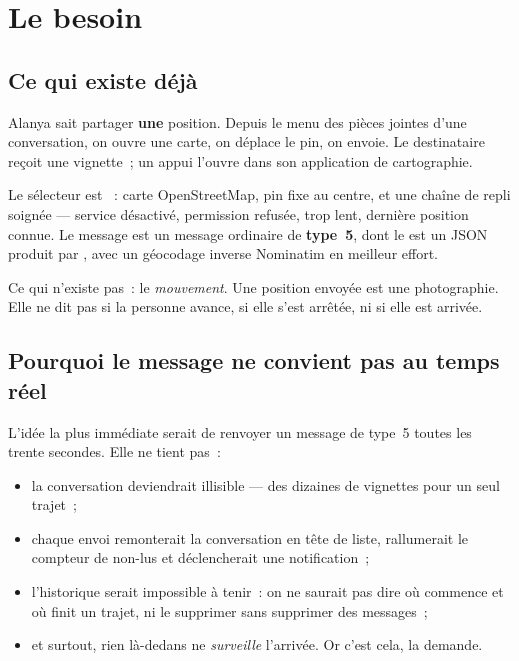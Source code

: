 
\chapter{Le besoin}

\section{Ce qui existe déjà}

Alanya sait partager \textbf{une} position. Depuis le menu des pièces jointes d'une
conversation, on ouvre une carte, on déplace le pin, on envoie. Le destinataire reçoit une
vignette~; un appui l'ouvre dans son application de cartographie.

\begin{constat}
Le sélecteur est ~: carte
OpenStreetMap, pin fixe au centre, et une chaîne de repli soignée --- service désactivé,
permission refusée,  trop lent, dernière position connue. Le
message est un message ordinaire de \textbf{type~5}, dont le  est un JSON
 produit par
, avec un géocodage inverse Nominatim en
meilleur effort.
\end{constat}

Ce qui n'existe pas~: le \emph{mouvement}. Une position envoyée est une photographie. Elle
ne dit pas si la personne avance, si elle s'est arrêtée, ni si elle est arrivée.

\section{Pourquoi le message ne convient pas au temps réel}

L'idée la plus immédiate serait de renvoyer un message de type~5 toutes les trente secondes.
Elle ne tient pas~:

\begin{itemize}[leftmargin=1.4em]
  \item la conversation deviendrait illisible --- des dizaines de vignettes pour un seul
        trajet~;
  \item chaque envoi remonterait la conversation en tête de liste, rallumerait le compteur
        de non-lus et déclencherait une notification~;
  \item l'historique serait impossible à tenir~: on ne saurait pas dire où commence et où
        finit un trajet, ni le supprimer sans supprimer des messages~;
  \item et surtout, rien là-dedans ne \emph{surveille} l'arrivée. Or c'est cela, la demande.
\end{itemize}


